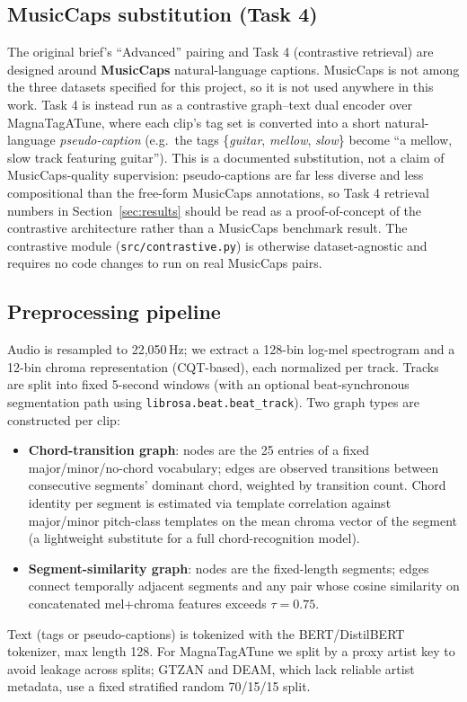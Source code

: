 \documentclass[10pt,twocolumn]{article}
\begin{document}
\subsection{MusicCaps substitution (Task 4)}
The original brief's ``Advanced'' pairing and Task 4 (contrastive retrieval)
are designed around \textbf{MusicCaps} natural-language captions. MusicCaps
is not among the three datasets specified for this project, so it is not
used anywhere in this work. Task 4 is instead run as a contrastive
graph--text dual encoder over MagnaTagATune, where each clip's tag set is
converted into a short natural-language \emph{pseudo-caption} (e.g.\ the
tags \{\textit{guitar}, \textit{mellow}, \textit{slow}\} become ``a mellow,
slow track featuring guitar''). This is a documented substitution, not a
claim of MusicCaps-quality supervision: pseudo-captions are far less
diverse and less compositional than the free-form MusicCaps annotations,
so Task 4 retrieval numbers in Section~\ref{sec:results} should be read as
a proof-of-concept of the contrastive architecture rather than a MusicCaps
benchmark result. The contrastive module (\texttt{src/contrastive.py}) is
otherwise dataset-agnostic and requires no code changes to run on real
MusicCaps pairs.

\subsection{Preprocessing pipeline}
Audio is resampled to 22{,}050\,Hz; we extract a 128-bin log-mel
spectrogram and a 12-bin chroma representation (CQT-based), each normalized
per track. Tracks are split into fixed 5-second windows (with an optional
beat-synchronous segmentation path using \texttt{librosa.beat.beat\_track}).
Two graph types are constructed per clip:
\begin{itemize}
  \item \textbf{Chord-transition graph}: nodes are the 25 entries of a
  fixed major/minor/no-chord vocabulary; edges are observed transitions
  between consecutive segments' dominant chord, weighted by transition
  count. Chord identity per segment is estimated via template correlation
  against major/minor pitch-class templates on the mean chroma vector of
  the segment (a lightweight substitute for a full chord-recognition
  model).
  \item \textbf{Segment-similarity graph}: nodes are the fixed-length
  segments; edges connect temporally adjacent segments and any pair whose
  cosine similarity on concatenated mel+chroma features exceeds
  $\tau = 0.75$.
\end{itemize}
Text (tags or pseudo-captions) is tokenized with the BERT/DistilBERT
tokenizer, max length 128. For MagnaTagATune we split by a proxy artist
key to avoid leakage across splits; GTZAN and DEAM, which lack reliable
artist metadata, use a fixed stratified random 70/15/15 split.
\end{document}
